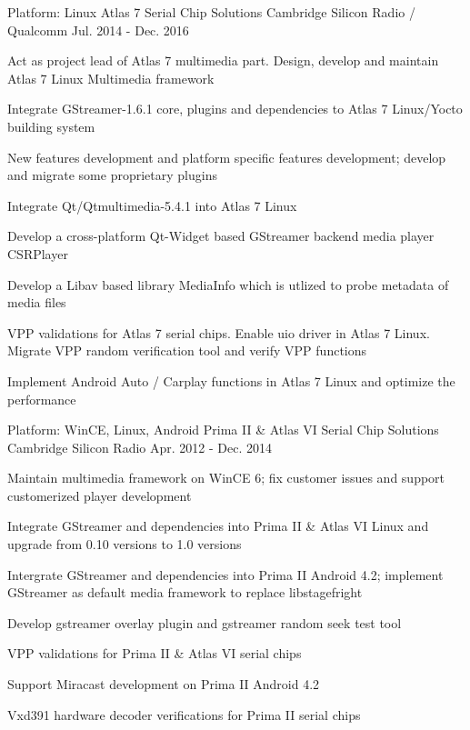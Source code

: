 \begin{cventries}
  \cventry
    {Platform: Linux} %
    {Atlas 7 Serial Chip Solutions} %
    {Cambridge Silicon Radio / Qualcomm} %
    {Jul. 2014 - Dec. 2016} %
    {
      \begin{cvitems} %
        \item {Act as project lead of Atlas 7 multimedia part. Design, develop and maintain Atlas 7 Linux Multimedia framework}
        \item {Integrate GStreamer-1.6.1 core, plugins and dependencies to Atlas 7 Linux/Yocto building system}
        \item {New features development and platform specific features development; develop and migrate some proprietary plugins}
        \item {Integrate Qt/Qtmultimedia-5.4.1 into Atlas 7 Linux}
        \item {Develop a cross-platform Qt-Widget based GStreamer backend media player CSRPlayer}
        \item {Develop a Libav based library MediaInfo which is utlized to probe metadata of media files}
        \item {VPP validations for Atlas 7 serial chips. Enable uio driver in Atlas 7 Linux. Migrate VPP random verification tool and verify VPP functions}
		\item {Implement Android Auto / Carplay functions in Atlas 7 Linux and optimize the performance}
      \end{cvitems}
    }

  \cventry
    {Platform: WinCE, Linux, Android} %
    {Prima II \& Atlas VI Serial Chip Solutions} %
    {Cambridge Silicon Radio} %
    {Apr. 2012 - Dec. 2014} %
    {
      \begin{cvitems} %
        \item {Maintain multimedia framework on WinCE 6; fix customer issues and support customerized player development}
        \item {Integrate GStreamer and dependencies into Prima II \& Atlas VI Linux and upgrade from 0.10 versions to 1.0 versions}
        \item {Intergrate GStreamer and dependencies into Prima II Android 4.2; implement GStreamer as default media framework to replace libstagefright}
		\item {Develop gstreamer overlay plugin and gstreamer random seek test tool}
        \item {VPP validations for Prima II \& Atlas VI serial chips}
		\item {Support Miracast development on Prima II Android 4.2}
        \item {Vxd391 hardware decoder verifications for Prima II serial chips}
      \end{cvitems}
    }


\end{cventries}
